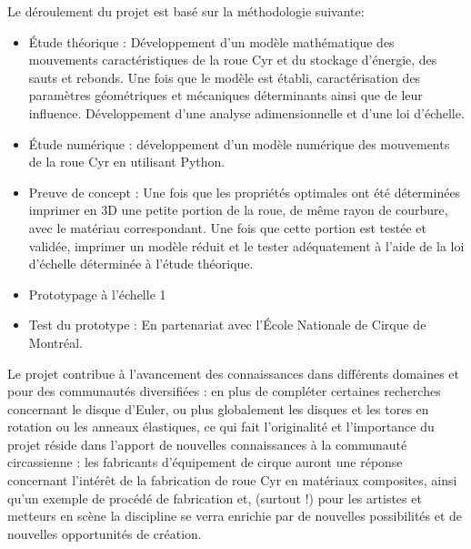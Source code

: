 Le déroulement du projet est basé sur la méthodologie suivante:
\begin{itemize}
\item Étude théorique : Développement d’un modèle mathématique des mouvements caractéristiques de la roue Cyr et du stockage d’énergie, des sauts et rebonds. Une fois que le modèle est établi, caractérisation des paramètres géométriques et mécaniques déterminants ainsi que de leur influence. Développement d’une analyse adimensionnelle et d’une loi d’échelle.
\item Étude numérique : développement d’un modèle numérique des mouvements de la roue Cyr en utilisant Python.
\item Preuve de concept : Une fois que les propriétés optimales ont été déterminées imprimer en 3D une petite portion de la roue, de même rayon de courbure, avec le matériau correspondant. Une fois que cette portion est testée et validée, imprimer un modèle réduit et le tester adéquatement à l’aide de la loi d’échelle déterminée à l’étude théorique.
\item Prototypage à l’échelle 1
\item Test du prototype : En partenariat avec l’École Nationale de Cirque de Montréal.
\end{itemize}

Le projet contribue à l’avancement des connaissances dans différents domaines et pour des communautés diversifiées : en plus de compléter certaines recherches concernant le disque d’Euler, ou plus globalement les disques et les tores en rotation ou les anneaux élastiques, ce qui fait l’originalité et l’importance du projet réside dans l’apport de nouvelles connaissances à la communauté circassienne : les fabricants d’équipement de cirque auront une réponse concernant l’intérêt de la fabrication de roue Cyr en matériaux composites, ainsi qu’un exemple de procédé de fabrication et, (surtout !) pour les artistes et metteurs en scène la discipline se verra enrichie par de nouvelles possibilités et de nouvelles opportunités de création.

